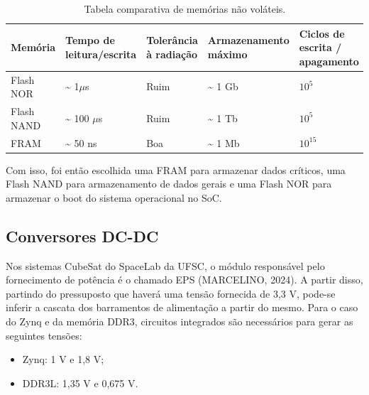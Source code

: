 \begin{table}[H]
	\ABNTEXfontereduzida
	\caption{\label{tab:memnvol}Tabela comparativa de memórias não voláteis.}
    \centering
    \begin{tabular}{@{} >{\centering}p{2cm} >{\centering}p{3cm} >{\centering}p{3cm} >{\centering}p{3cm}>{\centering}p{3cm} @{}}
    
		\toprule
		\textbf{Memória} & \textbf{Tempo de leitura/escrita} & \textbf{Tolerância à radiação} & \textbf{Armazenamento máximo} & \textbf{Ciclos de escrita / apagamento} \tabularnewline 
        \midrule
        Flash NOR & \textasciitilde{} 1$\mu$s & Ruim & \textasciitilde{} 1 Gb & \textbf{$10^5$} \tabularnewline
        
        \midrule
        Flash NAND & \textasciitilde{} 100 $\mu$s & Ruim &\textasciitilde{} 1 Tb & \textbf{$10^5$} \tabularnewline 

        \midrule
        FRAM & \textasciitilde{} 50 ns & Boa & \textasciitilde{} 1 Mb & \textbf{$10^{15}$}  \tabularnewline 
        
        \bottomrule
	\end{tabular}
\end{table}

Com isso, foi então escolhida uma FRAM para armazenar dados críticos, uma Flash NAND para armazenamento de dados gerais e uma Flash NOR para armazenar o boot do sistema operacional no SoC.

\subsection{Conversores DC-DC}
Nos sistemas CubeSat do SpaceLab da UFSC, o módulo responsável pelo fornecimento de potência é o chamado EPS (MARCELINO, 2024). A partir disso, partindo do pressuposto que haverá uma tensão fornecida de 3,3 V, pode-se inferir a cascata dos barramentos de alimentação a partir do mesmo. Para o caso do Zynq e da memória DDR3, circuitos integrados são necessários para gerar as seguintes tensões: 

\begin{itemize}
	\item Zynq: 1 V e 1,8 V; 
	\item DDR3L: 1,35 V e 0,675 V.
\end{itemize}

